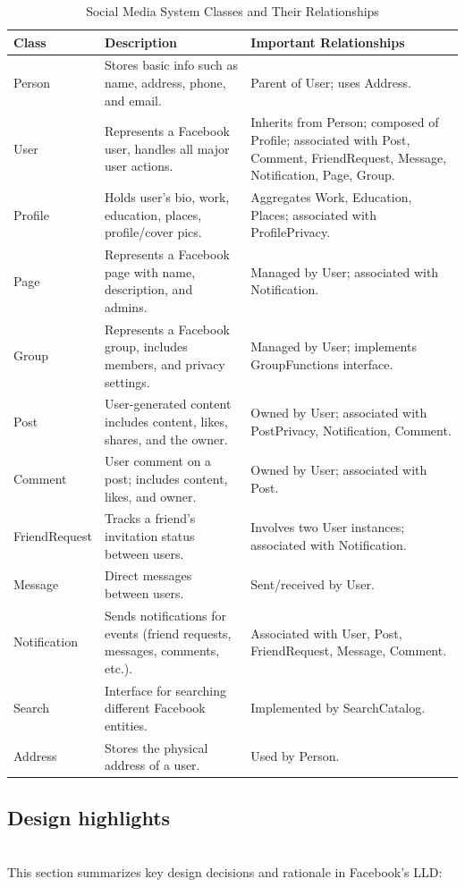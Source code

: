 \begin{table}[h!]
\centering
\begin{tabularx}{\textwidth}{|X|X|X|}
\hline
\textbf{Class} & \textbf{Description} & \textbf{Important Relationships} \\
\hline
Person & Stores basic info such as name, address, phone, and email. & Parent of User; uses Address. \\
\hline
User & Represents a Facebook user, handles all major user actions. & Inherits from Person; composed of Profile; associated with Post, Comment, FriendRequest, Message, Notification, Page, Group. \\
\hline
Profile & Holds user’s bio, work, education, places, profile/cover pics. & Aggregates Work, Education, Places; associated with ProfilePrivacy. \\
\hline
Page & Represents a Facebook page with name, description, and admins. & Managed by User; associated with Notification. \\
\hline
Group & Represents a Facebook group, includes members, and privacy settings. & Managed by User; implements GroupFunctions interface. \\
\hline
Post & User-generated content includes content, likes, shares, and the owner. & Owned by User; associated with PostPrivacy, Notification, Comment. \\
\hline
Comment & User comment on a post; includes content, likes, and owner. & Owned by User; associated with Post. \\
\hline
FriendRequest & Tracks a friend’s invitation status between users. & Involves two User instances; associated with Notification. \\
\hline
Message & Direct messages between users. & Sent/received by User. \\
\hline
Notification & Sends notifications for events (friend requests, messages, comments, etc.). & Associated with User, Post, FriendRequest, Message, Comment. \\
\hline
Search & Interface for searching different Facebook entities. & Implemented by SearchCatalog. \\
\hline
Address & Stores the physical address of a user. & Used by Person. \\
\hline
\end{tabularx}
\caption{Social Media System Classes and Their Relationships}
\label{tab:social_media_classes}
\end{table}

\subsection{Design highlights}\label{XPAE1pHZBHZ9Br522mZVR}
\\
This section summarizes key design decisions and rationale in Facebook's LLD:

